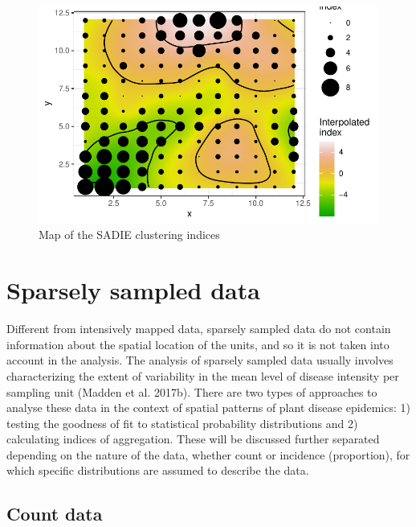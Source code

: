 \documentclass[
  letterpaper,
  DIV=11,
  numbers=noendperiod]{scrreprt}
\begin{document}
\begin{figure}[H]

{\centering \includegraphics{spatial-tests_files/figure-pdf/fig-sadie2-1.pdf}

}

\caption{\label{fig-sadie2}Map of the SADIE clustering indices}

\end{figure}

\hypertarget{sparsely-sampled-data}{%
\section{Sparsely sampled data}\label{sparsely-sampled-data}}

Different from intensively mapped data, sparsely sampled data do not
contain information about the spatial location of the units, and so it
is not taken into account in the analysis. The analysis of sparsely
sampled data usually involves characterizing the extent of variability
in the mean level of disease intensity per sampling unit (Madden et al.
2017b). There are two types of approaches to analyse these data in the
context of spatial patterns of plant disease epidemics: 1) testing the
goodness of fit to statistical probability distributions and 2)
calculating indices of aggregation. These will be discussed further
separated depending on the nature of the data, whether count or
incidence (proportion), for which specific distributions are assumed to
describe the data.

\hypertarget{count-data}{%
\subsection{Count data}\label{count-data}}
\end{document}
